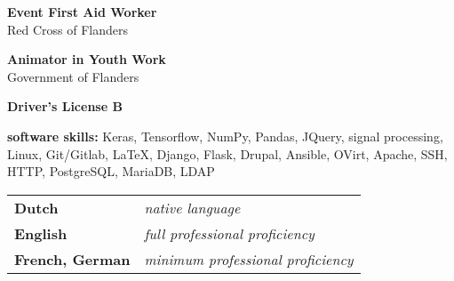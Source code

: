 

\divider


\textbf{Event First Aid Worker} \\ Red Cross of Flanders

\divider

\textbf{Animator in Youth Work} \\ Government of Flanders

\divider

\textbf{Driver's License B}











\divider

\textbf{software skills:}  Keras, Tensorflow, NumPy, Pandas, JQuery, signal processing, Linux, Git/Gitlab, \LaTeX, Django, Flask, Drupal, Ansible, OVirt, Apache, SSH, HTTP, PostgreSQL,
MariaDB, LDAP

\divider

\begin{tabular}{p{2.5cm} p{4cm}}
\textbf{Dutch} & \textit{native language} \\
\textbf{English} & \textit{full professional proficiency}\\
\textbf{French, German} &\textit{minimum professional \newline proficiency}
\end{tabular}

